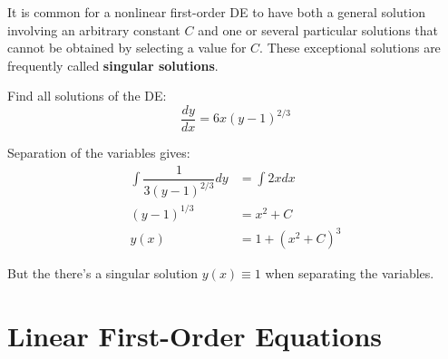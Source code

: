 \begin{definition}
    It is common for a nonlinear first-order DE to have both a general solution involving an arbitrary constant \(C\) and one or several particular solutions that cannot be obtained by selecting a value for \(C\).  
    These exceptional solutions are frequently called \textbf{singular solutions}. 
\end{definition}

\begin{example}
    Find all solutions of the DE:
    \[
        \dfrac{dy}{dx} = 6x(y-1)^{2/3}
    \]

    Separation of the variables gives:
    \begin{align*}
        \int \dfrac{1}{3(y-1)^{2/3}} dy &= \int 2x dx \\
        (y-1)^{1/3} &= x^2 +C \\
        y(x) &= 1 + (x^2 + C)^3 \tag{general solutions}
    \end{align*}

    But the there's a singular solution \(y(x) \equiv 1\) when separating the variables. 
\end{example}

\section{Linear First-Order Equations}
